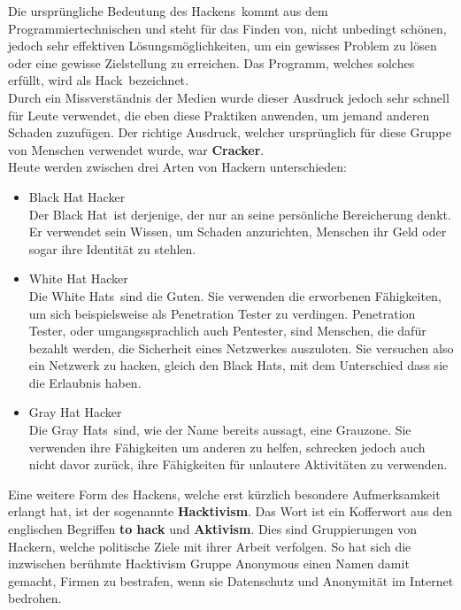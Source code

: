 \documentclass[12pt,a4paper]{report}
\begin{document}
Die ursprüngliche Bedeutung des \glqq Hackens\grqq \ kommt aus dem Programmiertechnischen und steht für das Finden von, nicht unbedingt schönen, jedoch sehr effektiven Lösungsmöglichkeiten, um ein gewisses Problem zu lösen oder eine gewisse Zielstellung zu erreichen. Das Programm, welches solches erfüllt, wird als \glqq Hack\grqq \ bezeichnet.\\
Durch ein Missverständnis der Medien wurde dieser Ausdruck jedoch sehr schnell für Leute verwendet, die eben diese Praktiken anwenden, um jemand anderen Schaden zuzufügen. Der richtige Ausdruck, welcher ursprünglich für diese Gruppe von Menschen verwendet wurde, war \textbf{Cracker}.\\

Heute werden zwischen drei Arten von Hackern unterschieden:
\begin{itemize}
\item Black Hat Hacker\\
Der \glqq Black Hat\grqq \ ist derjenige, der nur an seine persönliche Bereicherung denkt. Er verwendet sein Wissen, um Schaden anzurichten, Menschen ihr Geld oder sogar ihre Identität zu stehlen. 
\item White Hat Hacker\\
Die \glqq White Hats\grqq \ sind die \glqq Guten\grqq . Sie verwenden die erworbenen Fähigkeiten, um sich beispielsweise als Penetration Tester zu verdingen. Penetration Tester, oder umgangssprachlich auch Pentester, sind Menschen, die dafür bezahlt werden, die Sicherheit eines Netzwerkes auszuloten. Sie versuchen also ein Netzwerk zu hacken, gleich den Black Hats, mit dem Unterschied dass sie die Erlaubnis haben.
\item Gray Hat Hacker\\
Die \glqq Gray Hats\grqq \ sind, wie der Name bereits aussagt, eine Grauzone. Sie verwenden ihre Fähigkeiten um anderen zu helfen, schrecken jedoch auch nicht davor zurück, ihre Fähigkeiten für unlautere Aktivitäten zu verwenden.
\end{itemize}

Eine weitere Form des Hackens, welche erst kürzlich besondere Aufmerksamkeit erlangt hat, ist der sogenannte \textbf{Hacktivism}. Das Wort ist ein Kofferwort aus den englischen Begriffen \textbf{to hack} und \textbf{Aktivism}. Dies sind Gruppierungen von Hackern, welche politische Ziele mit ihrer Arbeit verfolgen. So hat sich die inzwischen berühmte Hacktivism Gruppe Anonymous einen Namen damit gemacht, Firmen zu \glqq bestrafen\grqq , wenn sie Datenschutz und Anonymität im Internet bedrohen.\\
\end{document}
